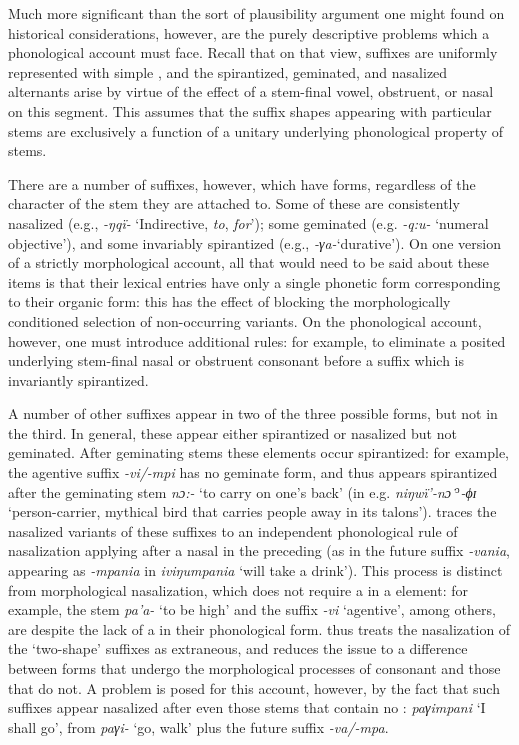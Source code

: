 Much more significant than the sort of plausibility argument one might
found on historical considerations, however, are the purely
descriptive problems which a phonological account must face. Recall
that on that view, suffixes are uniformly represented with simple
, and the spirantized, geminated, and nasalized alternants
arise by virtue of the effect of a stem-final vowel, obstruent, or
nasal on this segment. This assumes that the suffix shapes appearing
with particular stems are exclusively a function of a unitary
underlying phonological property of stems.

There are a number of suffixes, however, which have  forms,
regardless of the character of the stem they are attached to. Some of
these are consistently nasalized (e.g., \emph{-ŋqï-} `Indirective,
\emph{to}, \emph{for}'); some geminated (e.g. \emph{-q:u-} `numeral
objective'), and some invariably spirantized (e.g.,
\emph{-γa-}`durative'). On one version of a strictly morphological
account, all that would need to be said about these items is that
their lexical entries have only a single phonetic form corresponding
to their organic form: this has the effect of blocking the
morphologically conditioned selection of non-occurring variants. On the
phonological account, however, one must introduce additional rules:
for example, to eliminate a posited underlying stem-final nasal or
obstruent consonant before a suffix which is invariantly spirantized.

A number of other suffixes appear in two of the three possible forms,
but not in the third. In general, these appear either spirantized or
nasalized but not geminated. After geminating stems these elements
occur spirantized: for example, the agentive suffix \emph{-vi/-mpi}
has no geminate form, and thus appears spirantized after the
geminating stem \emph{nɔ:-} `to carry on one's back' (in
e.g. \emph{niŋwï'-nɔ˙$^{\textit{ɔ}}$-ϕɪ} `person-carrier, mythical
bird that carries people away in its talons'). {\Sapir} traces the
nasalized variants of these suffixes to an independent phonological
rule of nasalization applying after a nasal in the preceding 
(as in the future suffix \emph{-vania}, appearing as \emph{-mpania} in
\emph{iviŋumpania} `will take a drink'). This process is distinct from
morphological nasalization, which does not require a 
in a  element: for example, the stem \emph{pa'a-} `to be
high' and the suffix \emph{-vi} `agentive', among others, are
 despite the lack of a  in their phonological
form. {\Sapir} thus treats the nasalization of the `two-shape' suffixes
as extraneous, and reduces the issue to a difference between forms
that undergo the morphological processes of consonant  and
those that do not. A problem is posed for this account, however, by
the fact that such suffixes appear nasalized after even those
 stems that contain no : \emph{paγimpani} `I
shall go', from  \emph{paγi-} `go, walk' plus the future
suffix \emph{-va/-mpa}.

